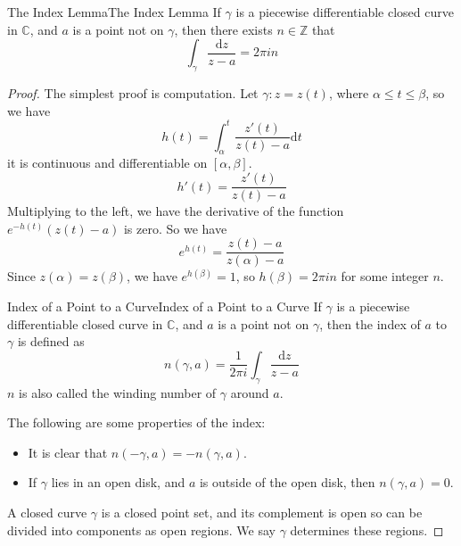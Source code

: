 \documentclass[../main.tex]{subfiles}
\begin{document}
\begin{lemma}{The Index Lemma}{The Index Lemma}
	If $\gamma$ is a piecewise differentiable closed curve in $\mathbb{C}$, and $a$ is a point not on $\gamma$, then there exists $n\in \mathbb{Z}$ that
	\begin{equation}
		\int_{\gamma} \frac{\mathrm{d} z}{z-a} = 2 \pi i n
	\end{equation}
\end{lemma}
\begin{proof}
The simplest proof is computation. Let $\gamma:z=z(t)$, where $\alpha\leq t\leq \beta$, so we have
\begin{equation*}
h(t) = \int_{\alpha}^t \frac{z'(t)}{z(t)-a} \mathrm{d} t
\end{equation*}
it is continuous and differentiable on $[\alpha,\beta]$.
\begin{equation*}
	h'(t) = \frac{z'(t)}{z(t)-a}
\end{equation*}
Multiplying to the left, we have the derivative of the function $e^{-h(t)}(z(t)-a)$ is zero. So we have
\begin{equation*}
	e^{h(t)} = \frac{z(t)-a}{z(\alpha)-a}
\end{equation*}
Since $z(\alpha)=z(\beta)$, we have $e^{h(\beta)} = 1$, so $h(\beta) = 2 \pi i n$ for some integer $n$.

\begin{definition}{Index of a Point to a Curve}{Index of a Point to a Curve}
	If $\gamma$ is a piecewise differentiable closed curve in $\mathbb{C}$, and $a$ is a point not on $\gamma$, then the index of $a$ to $\gamma$ is defined as
	\begin{equation}
		n(\gamma,a) = \frac{1}{2\pi i} \int_{\gamma} \frac{\mathrm{d} z}{z-a}
	\end{equation}
	$n$ is also called the winding number of $\gamma$ around $a$.
\end{definition}

The following are some properties of the index:
\begin{itemize}
\item It is clear that $n(-\gamma,a) = -n(\gamma,a)$.
\item If $\gamma$ lies in an open disk, and $a$ is outside of the open disk, then $n(\gamma,a) = 0$.
\end{itemize}

A closed curve $\gamma$ is a closed point set, and its complement is open so can be divided into components as open regions. We say $\gamma$ determines these regions.


\end{proof}
\end{document}
